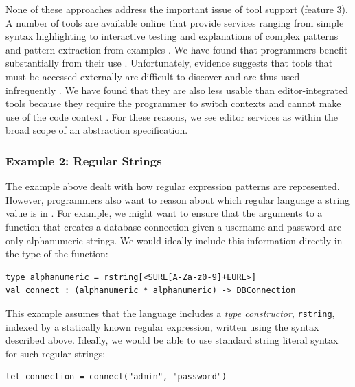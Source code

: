 None of these approaches address the important issue of tool support (feature 3). A number of tools are available online that provide services ranging from simple syntax highlighting to interactive testing and explanations of complex patterns \cite{regexr} and pattern extraction from examples \cite{_txt2re:_????}. We have found that programmers benefit substantially from their use \cite{Omar:2012:ACC:2337223.2337324}. Unfortunately, evidence suggests that tools that must be accessed externally are difficult to discover and are thus used infrequently \cite{Murphy-Hill:2011:PIE:1958824.1958888,Campbell:2008:DRT:1636642.1636651,Omar:2012:ACC:2337223.2337324}. We have found that they are also less usable than editor-integrated tools %
because they require the programmer to switch contexts and cannot make use of the code context \cite{Omar:2012:ACC:2337223.2337324}. %
For these reasons,   we see editor services as within the broad scope of an abstraction specification.

\subsubsection{Example 2: Regular Strings}\label{sec:rstr}
The example above dealt with how regular expression patterns are represented. However, programmers also want to reason about which regular language a string value is in \cite{sanitation-psp14}. For example, we might want to ensure that the arguments to a function that creates a database connection given a username and password are only alphanumeric strings. We would ideally include this information directly in the type of the  function:
\begin{lstlisting}[numbers=none]
type alphanumeric = rstring[<SURL[A-Za-z0-9]+EURL>]
val connect : (alphanumeric * alphanumeric) -> DBConnection
\end{lstlisting}

This example assumes that the language includes a \emph{type constructor}, \verb|rstring|, indexed by a statically known regular expression, written using the syntax described above. Ideally, we would be able to use standard string literal syntax for such regular strings:
\begin{lstlisting}[numbers=none]
let connection = connect("admin", "password")
\end{lstlisting}

